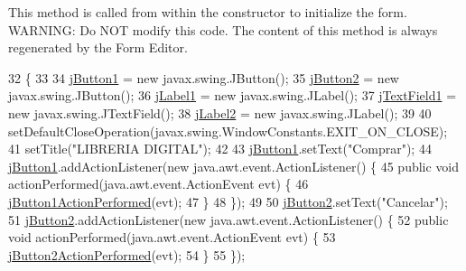 This method is called from within the constructor to initialize the form. W\+A\+R\+N\+I\+NG\+: Do N\+OT modify this code. The content of this method is always regenerated by the Form Editor. 
\begin{DoxyCode}
32                                   \{
33 
34         \mbox{\hyperlink{class_interfaz_package_1_1_comprar_lector_a13cefaf762557d197990543e13a3bc59}{jButton1}} = \textcolor{keyword}{new} javax.swing.JButton();
35         \mbox{\hyperlink{class_interfaz_package_1_1_comprar_lector_abb0ea1df40ce44e8356e98fe9824d075}{jButton2}} = \textcolor{keyword}{new} javax.swing.JButton();
36         \mbox{\hyperlink{class_interfaz_package_1_1_comprar_lector_a7e62e32a7c3e71321d44cc91402fa5d2}{jLabel1}} = \textcolor{keyword}{new} javax.swing.JLabel();
37         \mbox{\hyperlink{class_interfaz_package_1_1_comprar_lector_abba4b0576e701088c0c1389d7e28aaa9}{jTextField1}} = \textcolor{keyword}{new} javax.swing.JTextField();
38         \mbox{\hyperlink{class_interfaz_package_1_1_comprar_lector_aa53b79d81e5b7d3b02915635e09c9242}{jLabel2}} = \textcolor{keyword}{new} javax.swing.JLabel();
39 
40         setDefaultCloseOperation(javax.swing.WindowConstants.EXIT\_ON\_CLOSE);
41         setTitle(\textcolor{stringliteral}{"LIBRERIA DIGITAL"});
42 
43         \mbox{\hyperlink{class_interfaz_package_1_1_comprar_lector_a13cefaf762557d197990543e13a3bc59}{jButton1}}.setText(\textcolor{stringliteral}{"Comprar"});
44         \mbox{\hyperlink{class_interfaz_package_1_1_comprar_lector_a13cefaf762557d197990543e13a3bc59}{jButton1}}.addActionListener(\textcolor{keyword}{new} java.awt.event.ActionListener() \{
45             \textcolor{keyword}{public} \textcolor{keywordtype}{void} actionPerformed(java.awt.event.ActionEvent evt) \{
46                 \mbox{\hyperlink{class_interfaz_package_1_1_comprar_lector_a9466015e1f3d9facbd8b16cb18f5d893}{jButton1ActionPerformed}}(evt);
47             \}
48         \});
49 
50         \mbox{\hyperlink{class_interfaz_package_1_1_comprar_lector_abb0ea1df40ce44e8356e98fe9824d075}{jButton2}}.setText(\textcolor{stringliteral}{"Cancelar"});
51         \mbox{\hyperlink{class_interfaz_package_1_1_comprar_lector_abb0ea1df40ce44e8356e98fe9824d075}{jButton2}}.addActionListener(\textcolor{keyword}{new} java.awt.event.ActionListener() \{
52             \textcolor{keyword}{public} \textcolor{keywordtype}{void} actionPerformed(java.awt.event.ActionEvent evt) \{
53                 \mbox{\hyperlink{class_interfaz_package_1_1_comprar_lector_a67a613921bca8746fa553f8d7f28b6eb}{jButton2ActionPerformed}}(evt);
54             \}
55         \});

\end{DoxyCode}

